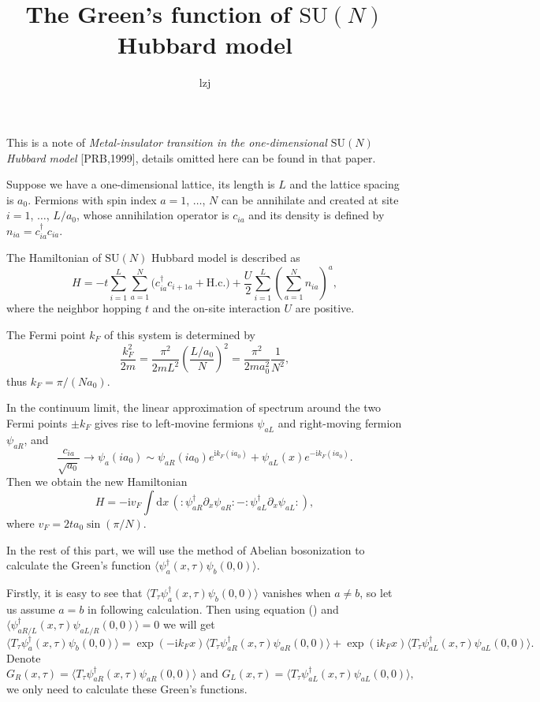 \documentclass[10pt]{extarticle}
\title{The Green's function of $\mathrm{SU}(N)$ Hubbard model}
\author{lzj}
\newcommand{\dd}{\mathrm{d}}
\newcommand{\ii}{\mathrm{i}}
\begin{document}
\maketitle

This is a note of \textit{Metal-insulator transition in the one-dimensional $\mathrm{SU}(N)$ Hubbard model} [PRB,1999], details omitted here can be found in that paper.

Suppose we have a one-dimensional lattice, its length is $L$ and the lattice spacing is $a_0$. Fermions with spin index $a=1$, $\dots$, $N$ can be annihilate and created at site $i=1$, $\dots$, $L/a_0$, whose annihilation operator is $c_{ia}$ and its density is defined by $n_{ia}=c_{ia}^\dag c_{ia}$.

The Hamiltonian of $\mathrm{SU}(N)$ Hubbard model is described as
\[
	H=-t\sum_{i=1}^L\sum_{a=1}^N\bigl(c_{ia}^\dag c_{i+1a}+\text{H.c.}\bigr)+\frac{U}{2}\sum_{i=1}^L\left(\sum_{a=1}^N n_{ia}\right)^a,
\]
where the neighbor hopping $t$ and the on-site interaction $U$ are positive.

The Fermi point $k_F$ of this system is determined by
\[
	\frac{k_F^2}{2m}=\frac{\pi^2}{2mL^2}\left(\frac{L/a_0}{N}\right)^2=\frac{\pi^2}{2ma_0^2}\frac{1}{N^2},
\]
thus $k_F=\pi/(Na_0)$.

In the continuum limit, the linear approximation of spectrum around the two Fermi points $\pm k_F$ gives rise to left-movine fermions $\psi_{aL}$ and right-moving fermion $\psi_{aR}$, and
\begin{equation}
	\frac{c_{ia}}{\sqrt{a_0}}\to \psi_a(ia_0)\sim \psi_{aR}(ia_0)e^{\ii k_F (ia_0)}+\psi_{aL}(x)e^{-\ii k_F (ia_0)}.
\end{equation}
Then we obtain the new Hamiltonian
\[
	H=-\ii v_F \int \dd x \,\left(:\psi_{aR}^\dag \partial_x \psi_{aR}:-:\psi_{aL}^\dag \partial_x \psi_{aL}:\right),
\]
where $v_F=2 t a_0 \sin(\pi /N)$.

In the rest of this part, we will use the method of Abelian bosonization to calculate the Green's function $\langle \psi_a^\dag(x,\tau)\psi_b(0,0)\rangle$. 

Firstly, it is easy to see that $\langle T_\tau \psi_a^\dag(x,\tau)\psi_b(0,0)\rangle$ vanishes when $a\neq b$, so let us assume $a=b$ in following calculation. Then using equation (\theequation) and $\langle \psi_{aR/L}^\dag(x,\tau)\psi_{aL/R}(0,0)\rangle = 0$ we will get
\[
	\langle T_\tau \psi_a^\dag(x,\tau)\psi_b(0,0)\rangle=\exp(-\ii k_Fx)\langle T_\tau \psi_{aR}^\dag(x,\tau)\psi_{aR}(0,0)\rangle+\exp(\ii k_Fx)\langle T_\tau \psi_{aL}^\dag(x,\tau)\psi_{aL}(0,0)\rangle.
\]
Denote
\[
	G_R(x,\tau)=\langle T_\tau \psi_{aR}^\dag(x,\tau)\psi_{aR}(0,0)\rangle\text{ and }G_L(x,\tau)=\langle T_\tau \psi_{aL}^\dag(x,\tau)\psi_{aL}(0,0)\rangle,
\]
we only need to calculate these Green's functions.
\end{document}
